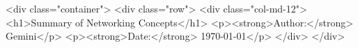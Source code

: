 \documentclass{article}
\begin{document}
\begin{itemize}
																																																																																																																																																																																																																																																																																																																																																																																																																																																																																																																																																																																																																																																																																																																																																																																																																																																																																																																																																																																																																																																																																																																																																																																																																																																																																																																																																																																																																																																																																																																																																																																																											<div class="container">
  <div class="row">
    <div class="col-md-12">
      <h1>Summary of Networking Concepts</h1>
      <p><strong>Author:</strong> Gemini</p>
      <p><strong>Date:</strong> \today</p>
    </div>
  </div>


\end{itemize}
\end{document}
